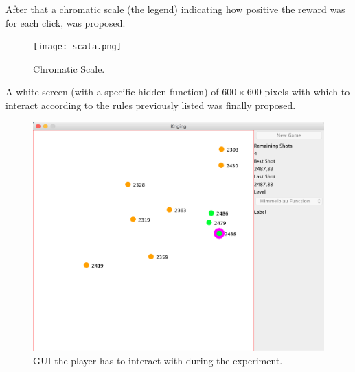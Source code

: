 After that a chromatic scale (the legend) indicating how positive the reward was for each click, was proposed.

\begin{figure}[h!]
	\centering
	\texttt{[image: scala.png]}
	\caption{Chromatic Scale.}
	\label{fig:Cromatic Scale}
\end{figure}

A white screen (with a specific hidden function) of $600 \times 600$ pixels with which to interact according to the rules previously listed was finally proposed.

\begin{figure}
	\centering
	\includegraphics[width= 8 cm, height= 6 cm]{IMAGES/Form}
	\caption{GUI the player has to interact with during the experiment.}
	\label{fig:form}
\end{figure}






